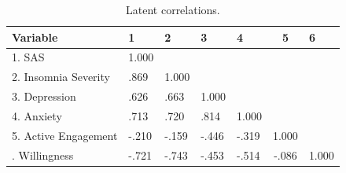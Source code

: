 \documentclass[
  letterpaper,
  DIV=11,
  numbers=noendperiod]{scrreprt}
\begin{document}
\begin{table}

\caption{Latent correlations.}
\centering
\begin{tabular}[t]{lllllcl}
\toprule
Variable & 1 & 2 & 3 & 4 & 5 & 6\\
\midrule
1. SAS & 1.000 &  &  &  &  & \\
2. Insomnia Severity & .869 & 1.000 &  &  &  & \\
3. Depression & .626 & .663 & 1.000 &  &  & \\
4. Anxiety & .713 & .720 & .814 & 1.000 &  & \\
5. Active Engagement & -.210 & -.159 & -.446 & -.319 & 1.000 & \\
\addlinespace
6. Willingness & -.721 & -.743 & -.453 & -.514 & -.086 & 1.000\\
\bottomrule
\end{tabular}
\end{table}
\end{document}
